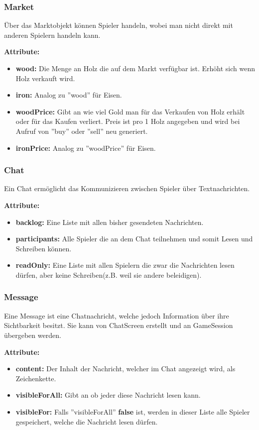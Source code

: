 \documentclass[fontsize=12pt,paper=a4,twoside]{scrartcl}
\begin{document}
\subsubsection{Market}

Über das Marktobjekt können Spieler handeln, wobei man nicht direkt mit anderen Spielern handeln kann.

\textbf{Attribute:}
\begin{itemize}
\item \textbf{wood:} Die Menge an Holz die auf dem Markt verfügbar ist. Erhöht sich wenn Holz verkauft wird.
\item \textbf{iron:} Analog zu ''wood'' für Eisen.
\item \textbf{woodPrice:} Gibt an wie viel Gold man für das Verkaufen von Holz erhält oder für das Kaufen verliert. Preis ist pro 1 Holz angegeben und wird bei Aufruf von ''buy'' oder ''sell'' neu generiert.
\item \textbf{ironPrice:} Analog zu ''woodPrice'' für Eisen.
\end{itemize}

\subsubsection{Chat}

Ein Chat ermöglicht das Kommunizieren zwischen Spieler über Textnachrichten.

\textbf{Attribute:}
\begin{itemize}
\item \textbf{backlog:} Eine Liste mit allen bisher gesendeten Nachrichten.
\item \textbf{participants:} Alle Spieler die an dem Chat teilnehmen und somit Lesen und Schreiben können.
\item \textbf{readOnly:} Eine Liste mit allen Spielern die zwar die Nachrichten lesen dürfen, aber keine Schreiben(z.B. weil sie andere beleidigen).
\end{itemize}

\subsubsection{Message}

Eine Message ist eine Chatnachricht, welche jedoch Information über ihre Sichtbarkeit besitzt. Sie kann von ChatScreen erstellt und an GameSession übergeben werden.

\textbf{Attribute:}
\begin{itemize}
\item \textbf{content:} Der Inhalt der Nachricht, welcher im Chat angezeigt wird, als Zeichenkette.
\item \textbf{visibleForAll:} Gibt an ob jeder diese Nachricht lesen kann. 
\item \textbf{visibleFor:} Falls ''visibleForAll'' \textbf{false} ist, werden in dieser Liste alle Spieler gespeichert, welche die Nachricht lesen dürfen.
\end{itemize}
\end{document}
